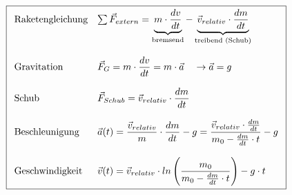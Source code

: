 \[ \boxed{\begin{array}{l l}
\text{Raketengleichung}
	& \sum \vec{F}_{extern} 
	= \underbrace{
		m \cdot \frac{dv}{dt}}_\text{bremsend}
	- \underbrace{
		\vec{v}_{relativ} \cdot \frac{dm}{dt}}_\text{treibend (Schub)} \\
& \\
\text{Gravitation}
	& \vec{F}_G = \displaystyle
		m \cdot \frac{dv}{dt} = m \cdot \vec{a} 
		\quad \rightarrow \vec{a} = g \\
& \\
\text{Schub}
	& \vec{F}_{Schub} = \displaystyle
		\vec{v}_{relativ} \cdot \frac{dm}{dt} \\
& \\
\text{Beschleunigung}
	& \vec{a}(t) = \displaystyle
		\frac{\vec{v}_{relativ}}{m} 
		\cdot \frac{dm}{dt} - g 
	= \displaystyle
		\frac{\vec{v}_{relativ}\cdot \frac{dm}{dt}}{
		m_0 - \frac{dm}{dt} \cdot t} - g \\
 & \\
\text{Geschwindigkeit}
	& \vec{v}(t) = \displaystyle
		\vec{v}_{relativ} 
		\cdot ln \left(\frac{m_0}{m_0-\frac{dm}{dt}\cdot t}\right)
	- g \cdot t 
\end{array} }\]
